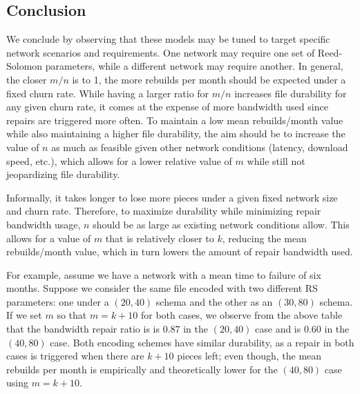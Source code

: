 \subsection{Conclusion}

We conclude by observing that these models may be tuned to target specific network scenarios and requirements. One network may require one set of Reed-Solomon parameters, while a different network may require another. In general, the closer $m/n$ is to 1, the more rebuilds per month should be expected under a fixed churn rate. While having a larger ratio for $m/n$ increases file durability for any given churn rate, it comes at the expense of more bandwidth used since repairs are triggered more often. To maintain a low mean rebuilds/month value while also maintaining a higher file durability, the aim should be to increase the value of $n$ as much as feasible given other network conditions (latency, download speed, etc.), which allows for a lower relative value of $m$ while still not jeopardizing file durability.

Informally, it takes longer to lose more pieces under a given fixed network size and churn rate. Therefore, to maximize durability while minimizing repair bandwidth usage, $n$ should be as large as existing network conditions allow. This allows for a value of $m$ that is relatively closer to $k$, reducing the mean rebuilds/month value, which in turn lowers the amount of repair bandwidth used.

For example, assume we have a network with a mean time to failure of six months.
Suppose we consider the same file encoded with two different RS parameters:
one under a $(20,40)$ schema and the other as an $(30,80)$ schema. If we set $m$ so that $m=k+10$ for both cases, we observe from the above table
that the bandwidth repair ratio is is $0.87$ in the $(20,40)$ case and is $0.60$ in the $(40,80)$ case. Both encoding schemes have similar durability, as a repair in both cases is triggered when there are $k+10$ pieces left; even though, the mean rebuilds per month
is empirically and theoretically lower for the $(40,80)$ case using $m=k+10$.
